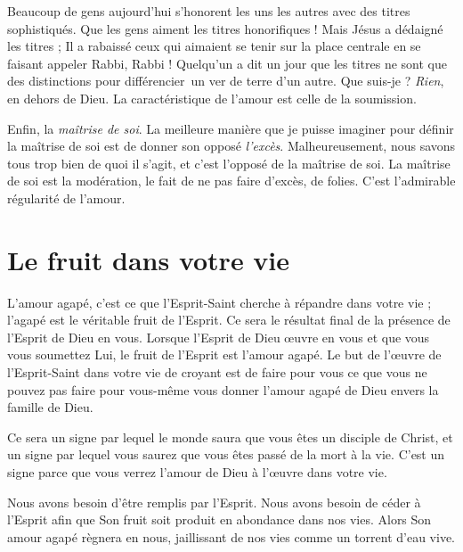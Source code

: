 Beaucoup de gens aujourd'hui s'honorent les uns les autres
 avec des titres sophistiqués. Que les gens aiment les titres honorifiques !
 Mais Jésus a dédaigné les titres ; Il a rabaissé ceux qui aimaient
 se tenir sur la place centrale en se faisant appeler\frcolon{}
 \Og Rabbi, Rabbi ! \Fg{}
 Quelqu'un a dit un jour que les titres ne sont que des distinctions
 pour différencier~un ver de terre d'un autre. Que suis-je ?
 \emph{Rien}, en dehors de Dieu. La caractéristique de l'amour
 est celle de la soumission.

Enfin, la \emph{maîtrise de soi}. La meilleure manière que je puisse imaginer
 pour définir la maîtrise de soi est de donner son opposé\frcolon{} \emph{l'excès}.
 Malheureusement, nous savons tous trop bien de quoi il s'agit,
 et c'est l'opposé de la maîtrise de soi.
 La maîtrise de soi est la modération, le fait de ne pas faire d'excès, de folies.
 C'est l'admirable régularité de l'amour.


\section{Le fruit dans votre vie}

L'amour agapé, c'est ce que l'Esprit-Saint cherche à répandre dans votre vie ;
 l'agapé est le véritable fruit de l'Esprit.
 Ce sera le résultat final de la présence de l'Esprit de Dieu en vous.
 Lorsque l'Esprit de Dieu œuvre en vous et que vous vous soumettez Lui,
 le fruit de l'Esprit est l'amour agapé. Le but de l'œuvre de
 l'Esprit-Saint dans votre vie de croyant est de faire pour vous
 ce que vous ne pouvez pas faire pour vous-même\frcolon{}
 vous donner l'amour agapé de Dieu envers la famille de Dieu.

Ce sera un signe par lequel le monde saura que vous êtes un disciple
 de Christ, et un signe par lequel vous saurez que vous êtes passé
 de la mort à la vie. C'est un signe parce que vous verrez
 l'amour de Dieu à l'œuvre dans votre vie.

Nous avons besoin d'être remplis par l'Esprit.
 Nous avons besoin de céder à l'Esprit afin que Son fruit soit produit
 en abondance dans nos vies. Alors Son amour agapé règnera en nous,
 jaillissant de nos vies comme un torrent d'eau vive.
\closechapter
{}

